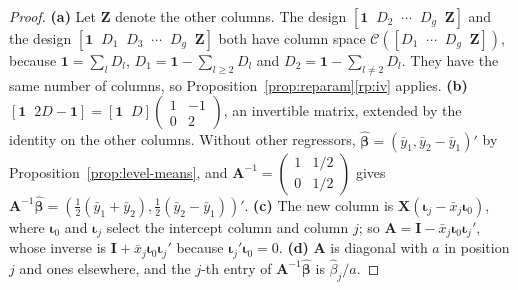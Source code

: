 \documentclass[14pt]{extarticle}
\theoremstyle{plain}
\theoremstyle{definition}
\theoremstyle{remark}
\newcommand{\bX}{\mathbf{X}}
\def\bb{\boldsymbol{\beta}}
\newcommand{\bI}{\mathbf{I}}
\newcommand{\bone}{\mathbf{1}}
\newcommand{\bA}{\mathbf{A}}
\newcommand{\calC}{\mathcal{C}}
\begin{document}
\begin{proof}
\textbf{(a)} Let $\mathbf{Z}$ denote the other columns. The design $[\bone \;\; D_2 \;\; \cdots \;\; D_g \;\; \mathbf{Z}]$ and the design $[\bone \;\; D_1 \;\; D_3 \;\; \cdots \;\; D_g \;\; \mathbf{Z}]$ both have column space $\calC([D_1 \;\; \cdots \;\; D_g \;\; \mathbf{Z}])$, because $\bone = \sum_lD_l$, $D_1 = \bone - \sum_{l \geqslant 2}D_l$ and $D_2 = \bone - \sum_{l \neq 2}D_l$. They have the same number of columns, so Proposition~\ref{prop:reparam}\ref{rp:iv} applies. \textbf{(b)} $[\bone \;\; 2D - \bone] = [\bone \;\; D]\begin{pmatrix} 1 & -1\\ 0 & 2\end{pmatrix}$, an invertible matrix, extended by the identity on the other columns. Without other regressors, $\hat{\bb} = (\bar y_1, \bar y_2 - \bar y_1)'$ by Proposition~\ref{prop:level-means}, and $\bA^{-1} = \begin{pmatrix} 1 & 1/2\\ 0 & 1/2\end{pmatrix}$ gives $\bA^{-1}\hat{\bb} = (\frac{1}{2}(\bar y_1 + \bar y_2), \frac{1}{2}(\bar y_2 - \bar y_1))'$. \textbf{(c)} The new column is $\bX(\boldsymbol\iota_j - \bar x_j\boldsymbol\iota_0)$, where $\boldsymbol\iota_0$ and $\boldsymbol\iota_j$ select the intercept column and column $j$; so $\bA = \bI - \bar x_j\boldsymbol\iota_0\boldsymbol\iota_j'$, whose inverse is $\bI + \bar x_j\boldsymbol\iota_0\boldsymbol\iota_j'$ because $\boldsymbol\iota_j'\boldsymbol\iota_0 = 0$. \textbf{(d)} $\bA$ is diagonal with $a$ in position $j$ and ones elsewhere, and the $j$-th entry of $\bA^{-1}\hat{\bb}$ is $\hat\beta_j/a$.


\end{proof}
\end{document}
